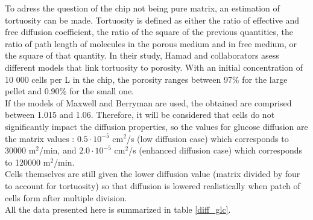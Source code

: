 \documentclass[11pt,a4paper]{article}
\begin{document}
To adress the question of the chip not being pure matrix, an estimation of tortuosity can be made. Tortuosity is defined as either the ratio of effective and free diffusion coefficient, the ratio of the square of the previous quantities, the ratio of path length of molecules in the porous medium and in free medium, or the square of that quantity. In their study, Hamad and collaborators asess different models that link tortuosity to porosity.\cite{Hamad2018} With an initial concentration of 10 000 cells per \textmu L in the chip, the porosity ranges between 97\% for the large pellet and 0.90\% for the small one.\\

If the models of Maxwell and Berryman are used, the obtained  are comprised between 1.015 and 1.06. Therefore, it will be considered that cells do not significantly impact the diffusion properties, so the values for glucose diffusion are the matrix values : $0.5\cdot 10^{-5}$ cm$^2$/s (low diffusion case) which corresponds to 30000 \textmu m$^2$/min, and $2.0\cdot 10^{-5}$ cm$^2$/s (enhanced diffusion case) which corresponds to 120000 \textmu m$^2$/min.\\

Cells themselves are still given the lower diffusion value (matrix divided by four to account for tortuosity) so that diffusion is lowered realistically when patch of cells form after multiple division.\\

All the data presented here is summarized in table \ref{diff_glc}.
\end{document}
